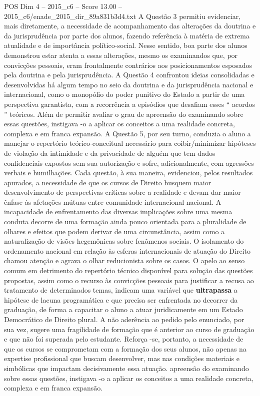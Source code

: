 \begin{textsample}{POS Dim 4 – 2015\_c6 – Score 13.00 – 2015\_c6/enade\_2015\_dir\_89a831b3d4.txt}
A Questão 3 permitiu evidenciar, mais diretamente, a necessidade de acompanhamento das alterações da doutrina e da jurisprudência por parte dos alunos, fazendo referência à matéria de extrema atualidade e de importância político-social.
Nesse sentido, boa parte dos alunos demonstrou estar atenta a essas alterações, mesmo os examinandos que, por convicções pessoais, eram frontalmente contrários aos posicionamentos esposados pela doutrina e pela jurisprudência.
A Questão 4 confrontou ideias consolidadas e desenvolvidas há algum tempo no seio da doutrina e da jurisprudência nacional e internacional, como o monopólio do poder punitivo do Estado a partir de uma perspectiva garantista, com a recorrência a episódios que desafiam esses “ acordos ” teóricos.
Além de permitir avaliar o grau de apreensão do examinando sobre essas questões, instigava -o a aplicar os conceitos a uma realidade concreta, complexa e em franca expansão.
A Questão 5, por seu turno, conduzia o aluno a manejar o repertório teórico-conceitual necessário para coibir/minimizar hipóteses de violação da intimidade e da privacidade de alguém que tem dados confidenciais expostos sem sua autorização e sofre, adicionalmente, com agressões verbais e humilhações.
Cada questão, à sua maneira, evidenciou, pelos resultados apurados, a necessidade de que os cursos de Direito busquem maior desenvolvimento de perspectivas críticas sobre a realidade e devam dar maior ênfase às afetações mútuas entre comunidade internacional-nacional.
A incapacidade de enfrentamento das diversas implicações sobre uma mesma conduta decorre de uma formação ainda pouco orientada para a pluralidade de olhares e efeitos que podem derivar de uma circunstância, assim como a naturalização de visões hegemônicas sobre fenômenos sociais.
O isolamento do ordenamento nacional em relação às esferas internacionais de atuação do Direito chamou atenção e agrava o olhar reducionista sobre os casos.
O apelo ao senso comum em detrimento do repertório técnico disponível para solução das questões propostas, assim como o recurso às convicções pessoais para justificar a recusa ao tratamento de determinados temas, indicam uma variável que \textbf{ultrapassa} a hipótese de lacuna programática e que precisa ser enfrentada no decorrer da graduação, de forma a capacitar o aluno a atuar juridicamente em um Estado Democrático de Direito plural.
A não aderência ao pedido pelo enunciado, por sua vez, sugere uma fragilidade de formação que é anterior ao curso de graduação e que não foi superada pelo estudante.
Reforça -se, portanto, a necessidade de que os cursos se comprometam com a formação dos seus alunos, não apenas na expertise profissional que buscam desenvolver, mas nas condições materiais e simbólicas que impactam decisivamente essa atuação. apreensão do examinando sobre essas questões, instigava -o a aplicar os conceitos a uma realidade concreta, complexa e em franca expansão.

\end{textsample}
